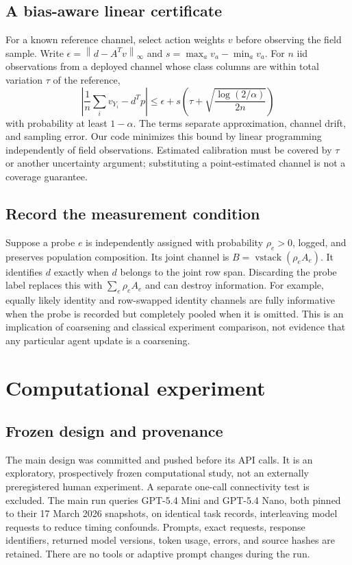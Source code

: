 \documentclass[10pt,twocolumn]{article}
\theoremstyle{definition}\newtheorem{definition}[theorem]{Definition}
\newcommand{\1}{\mathbf 1}
\newcommand{\norm}[1]{\left\lVert#1\right\rVert}
\begin{document}
\subsection{A bias-aware linear certificate}
For a known reference channel, select action weights $v$ before observing the field sample. Write $\epsilon=\norm{d-A^Tv}_\infty$ and $s=\max_a v_a-\min_a v_a$. For $n$ iid observations from a deployed channel whose class columns are within total variation $\tau$ of the reference,
\begin{equation}
 \left|\frac1n\sum_i v_{Y_i}-d^Tp\right|
 \leq \epsilon+s\left(\tau+\sqrt{\frac{\log(2/\alpha)}{2n}}\right)
\end{equation}
with probability at least $1-\alpha$. The terms separate approximation, channel drift, and sampling error. Our code minimizes this bound by linear programming independently of field observations. Estimated calibration must be covered by $\tau$ or another uncertainty argument; substituting a point-estimated channel is not a coverage guarantee.

\subsection{Record the measurement condition}
Suppose a probe $e$ is independently assigned with probability $\rho_e>0$, logged, and preserves population composition. Its joint channel is $B=\operatorname{vstack}(\rho_eA_e)$. It identifies $d$ exactly when $d$ belongs to the joint row span. Discarding the probe label replaces this with $\sum_e\rho_eA_e$ and can destroy information. For example, equally likely identity and row-swapped identity channels are fully informative when the probe is recorded but completely pooled when it is omitted. This is an implication of coarsening and classical experiment comparison, not evidence that any particular agent update is a coarsening.

\section{Computational experiment}
\subsection{Frozen design and provenance}
The main design was committed and pushed before its API calls. It is an exploratory, prospectively frozen computational study, not an externally preregistered human experiment. A separate one-call connectivity test is excluded. The main run queries GPT-5.4 Mini and GPT-5.4 Nano, both pinned to their 17 March 2026 snapshots, on identical task records, interleaving model requests to reduce timing confounds. Prompts, exact requests, response identifiers, returned model versions, token usage, errors, and source hashes are retained. There are no tools or adaptive prompt changes during the run.
\end{document}
